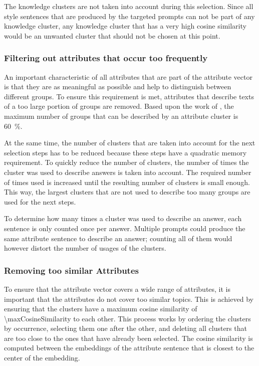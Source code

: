 The knowledge clusters are not taken into account during this selection. Since all style sentences that are produced by the targeted prompts can not be part of any knowledge cluster, any knowledge cluster that has a very high cosine similarity would be an unwanted cluster that should not be chosen at this point.


\subsubsection{Filtering out attributes that occur too frequently}
\label{sec:experiments:setup:selection:filteringOccurance}
An important characteristic of all attributes that are part of the attribute vector is that they are as meaningful as possible and help to distinguish between different groups. To ensure this requirement is met, attributes that describe texts of a too large portion of groups are removed. Based upon the work of \citet{patelLearningInterpretableStyle2023}, the maximum number of groups that can be described by an attribute cluster is \SI{60}{\percent}.

At the same time, the number of clusters that are taken into account for the next selection steps has to be reduced because these steps have a quadratic memory requirement. To quickly reduce the number of clusters, the number of times the cluster was used to describe answers is taken into account. The required number of times used is increased until the resulting number of clusters is small enough. This way, the largest clusters that are not used to describe too many groups are used for the next steps.

To determine how many times a cluster was used to describe an answer, each sentence is only counted once per answer. Multiple prompts could produce the same attribute sentence to describe an answer; counting all of them would however distort the number of usages of the clusters.

\subsubsection{Removing too similar Attributes}
\label{sec:experiments:setup:selection:removeSimilar}
To ensure that the attribute vector covers a wide range of attributes, it is important that the attributes do not cover too similar topics. This is achieved by ensuring that the clusters have a maximum cosine similarity of \num{\maxCosineSimilarity} to each other. This process works by ordering the clusters by occurrence, selecting them one after the other, and deleting all clusters that are too close to the ones that have already been selected.
The cosine similarity is computed between the embeddings of the attribute sentence that is closest to the center of the embedding.

